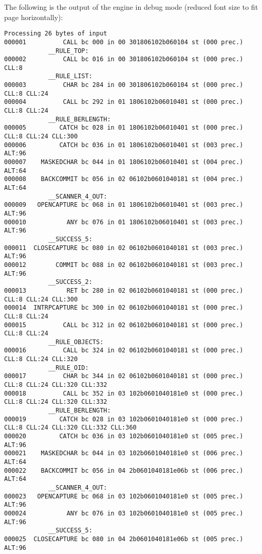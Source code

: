The following is the output of the engine in debug mode
(reduced font size to fit page horizontally):

\begin{changemargin}{-60mm}{0mm} 
\begin{myquote}
\begin{Verbatim}[fontsize=\scriptsize]
Processing 26 bytes of input
000001          CALL bc 000 in 00 301806102b060104 st (000 prec.) 
            __RULE_TOP:
000002          CALL bc 016 in 00 301806102b060104 st (000 prec.) CLL:8 
            __RULE_LIST:
000003          CHAR bc 284 in 00 301806102b060104 st (000 prec.) CLL:8 CLL:24 
000004          CALL bc 292 in 01 1806102b06010401 st (000 prec.) CLL:8 CLL:24 
            __RULE_BERLENGTH:
000005         CATCH bc 028 in 01 1806102b06010401 st (000 prec.) CLL:8 CLL:24 CLL:300 
000006         CATCH bc 036 in 01 1806102b06010401 st (003 prec.) ALT:96 
000007    MASKEDCHAR bc 044 in 01 1806102b06010401 st (004 prec.) ALT:64 
000008    BACKCOMMIT bc 056 in 02 06102b0601040181 st (004 prec.) ALT:64 
            __SCANNER_4_OUT:
000009   OPENCAPTURE bc 068 in 01 1806102b06010401 st (003 prec.) ALT:96 
000010           ANY bc 076 in 01 1806102b06010401 st (003 prec.) ALT:96 
            __SUCCESS_5:
000011  CLOSECAPTURE bc 080 in 02 06102b0601040181 st (003 prec.) ALT:96 
000012        COMMIT bc 088 in 02 06102b0601040181 st (003 prec.) ALT:96 
            __SUCCESS_2:
000013           RET bc 280 in 02 06102b0601040181 st (000 prec.) CLL:8 CLL:24 CLL:300 
000014  INTRPCAPTURE bc 300 in 02 06102b0601040181 st (000 prec.) CLL:8 CLL:24 
000015          CALL bc 312 in 02 06102b0601040181 st (000 prec.) CLL:8 CLL:24 
            __RULE_OBJECTS:
000016          CALL bc 324 in 02 06102b0601040181 st (000 prec.) CLL:8 CLL:24 CLL:320 
            __RULE_OID:
000017          CHAR bc 344 in 02 06102b0601040181 st (000 prec.) CLL:8 CLL:24 CLL:320 CLL:332 
000018          CALL bc 352 in 03 102b0601040181e0 st (000 prec.) CLL:8 CLL:24 CLL:320 CLL:332 
            __RULE_BERLENGTH:
000019         CATCH bc 028 in 03 102b0601040181e0 st (000 prec.) CLL:8 CLL:24 CLL:320 CLL:332 CLL:360 
000020         CATCH bc 036 in 03 102b0601040181e0 st (005 prec.) ALT:96 
000021    MASKEDCHAR bc 044 in 03 102b0601040181e0 st (006 prec.) ALT:64 
000022    BACKCOMMIT bc 056 in 04 2b0601040181e06b st (006 prec.) ALT:64 
            __SCANNER_4_OUT:
000023   OPENCAPTURE bc 068 in 03 102b0601040181e0 st (005 prec.) ALT:96 
000024           ANY bc 076 in 03 102b0601040181e0 st (005 prec.) ALT:96 
            __SUCCESS_5:
000025  CLOSECAPTURE bc 080 in 04 2b0601040181e06b st (005 prec.) ALT:96 

\end{Verbatim}
\end{myquote}
\end{changemargin}
